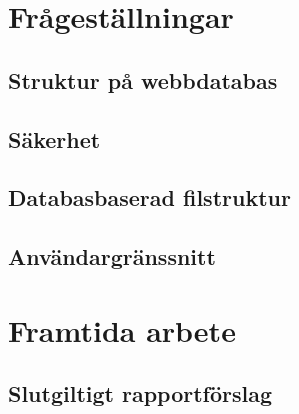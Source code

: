 \documentclass[a4paper,12pt,oneside,final]{extbook}
\begin{document}
\section{Frågeställningar}

\subsection{Struktur på webbdatabas}

\subsection{Säkerhet}

\subsection{Databasbaserad filstruktur}

\subsection{Användargränssnitt}

\section{Framtida arbete}

\subsection{Slutgiltigt rapportförslag}
\end{document}
